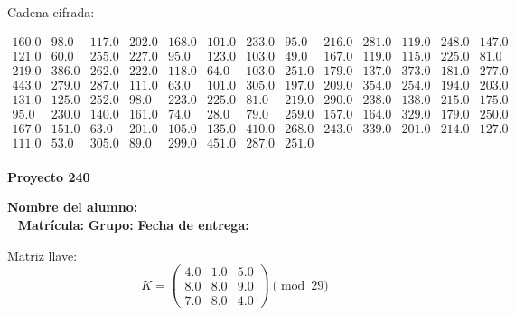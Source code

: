\documentclass[12pt]{article}
\begin{document}
Cadena cifrada:
\begin{center}
$\begin{array}{lllllllllllll}
160.0 & 98.0 & 117.0 & 202.0 & 168.0 & 101.0 & 233.0 & 95.0 & 216.0 & 281.0 & 119.0 & 248.0 & 147.0\\
121.0 & 60.0 & 255.0 & 227.0 & 95.0 & 123.0 & 103.0 & 49.0 & 167.0 & 119.0 & 115.0 & 225.0 & 81.0\\
219.0 & 386.0 & 262.0 & 222.0 & 118.0 & 64.0 & 103.0 & 251.0 & 179.0 & 137.0 & 373.0 & 181.0 & 277.0\\
443.0 & 279.0 & 287.0 & 111.0 & 63.0 & 101.0 & 305.0 & 197.0 & 209.0 & 354.0 & 254.0 & 194.0 & 203.0\\
131.0 & 125.0 & 252.0 & 98.0 & 223.0 & 225.0 & 81.0 & 219.0 & 290.0 & 238.0 & 138.0 & 215.0 & 175.0\\
95.0 & 230.0 & 140.0 & 161.0 & 74.0 & 28.0 & 79.0 & 259.0 & 157.0 & 164.0 & 329.0 & 179.0 & 250.0\\
167.0 & 151.0 & 63.0 & 201.0 & 105.0 & 135.0 & 410.0 & 268.0 & 243.0 & 339.0 & 201.0 & 214.0 & 127.0\\
111.0 & 53.0 & 305.0 & 89.0 & 299.0 & 451.0 & 287.0 & 251.0\\
\end{array}$
\end{center}

\newpage


\textbf{Proyecto 240}

\textbf{Nombre del alumno:} \underline{\hspace{13cm}}\\\
\vspace{1cm}
\textbf{Matrícula:} \underline{\hspace{4cm}} \hspace{1cm}
\textbf{Grupo:} \underline{\hspace{2cm}}
\textbf{Fecha de entrega:} \underline{\hspace{2cm}}

\medskip

Matriz llave:
\[
K = \begin{pmatrix}
4.0 & 1.0 & 5.0\\
8.0 & 8.0 & 9.0\\
7.0 & 8.0 & 4.0
\end{pmatrix} \pmod{29}
\]
\end{document}
